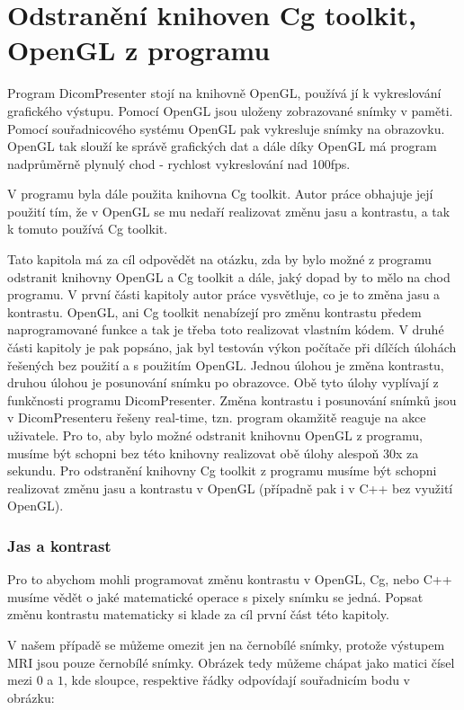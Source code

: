 \newpage
\chapter{Odstranění knihoven Cg toolkit, OpenGL z programu}
Program DicomPresenter stojí na knihovně OpenGL, používá jí k vykreslování grafického výstupu. Pomocí OpenGL jsou uloženy zobrazované snímky v paměti. Pomocí souřadnicového systému OpenGL pak vykresluje snímky na obrazovku. OpenGL tak slouží ke správě grafických dat a dále díky OpenGL má program nadprůměrně plynulý chod - rychlost vykreslování nad 100fps.

V programu byla dále použita knihovna Cg toolkit. Autor práce \cite{neskudla} obhajuje její použití tím, že v OpenGL se mu nedaří realizovat změnu jasu a kontrastu, a tak k tomuto používá Cg toolkit.

Tato kapitola má za cíl odpovědět na otázku, zda by bylo možné z programu odstranit knihovny OpenGL a Cg toolkit a dále, jaký dopad by to mělo na chod programu. V první části kapitoly autor práce vysvětluje, co je to změna jasu a kontrastu. OpenGL, ani Cg toolkit nenabízejí pro změnu kontrastu předem naprogramované funkce a tak je třeba toto realizovat vlastním kódem. V druhé části kapitoly je pak popsáno, jak byl testován výkon počítače při dílčích úlohách řešených bez použití a s použitím OpenGL. Jednou úlohou je změna kontrastu, druhou úlohou je posunování snímku po obrazovce. Obě tyto úlohy vyplívají z funkčnosti programu DicomPresenter. Změna kontrastu i posunování snímků jsou v DicomPresenteru řešeny real-time, tzn. program okamžitě reaguje na akce uživatele. Pro to, aby bylo možné odstranit knihovnu OpenGL z programu, musíme být schopni bez této knihovny realizovat obě úlohy alespoň 30x za sekundu. Pro odstranění knihovny Cg toolkit z programu musíme být schopni realizovat změnu jasu a kontrastu v OpenGL (případně pak i v C++ bez využití OpenGL).

\subsection{Jas  a kontrast}
Pro to abychom mohli programovat změnu kontrastu v OpenGL, Cg, nebo C++ musíme vědět o jaké matematické operace s pixely snímku se jedná. Popsat změnu kontrastu matematicky si klade za cíl první část této kapitoly.

 V našem případě se můžeme omezit jen na černobílé snímky, protože výstupem MRI jsou pouze černobílé snímky. Obrázek tedy můžeme chápat jako matici čísel mezi $0$ a $1$, kde sloupce, respektive řádky odpovídají souřadnicím bodu v obrázku:

